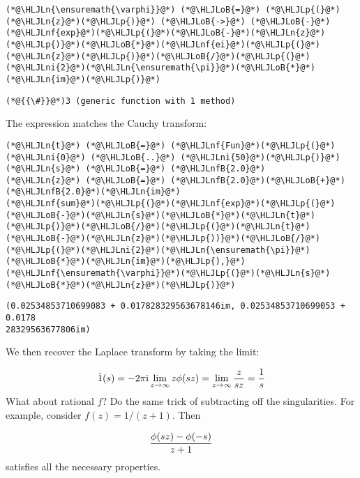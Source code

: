 \documentclass[12pt,landscape]{article}
\newcommand{\HLJLn}[1]{#1}
\newcommand{\HLJLnf}[1]{\textcolor[RGB]{66,102,213}{#1}}
\newcommand{\HLJLnfB}[1]{\textcolor[RGB]{59,151,46}{#1}}
\newcommand{\HLJLni}[1]{\textcolor[RGB]{59,151,46}{#1}}
\newcommand{\HLJLoB}[1]{\textcolor[RGB]{102,102,102}{\textbf{#1}}}
\newcommand{\HLJLp}[1]{#1}
\def\I{ {\rm i} }
\begin{document}
{\begin{lstlisting}
(*@\HLJLn{\ensuremath{\varphi}}@*) (*@\HLJLoB{=}@*) (*@\HLJLp{(}@*)(*@\HLJLn{z}@*)(*@\HLJLp{)}@*) (*@\HLJLoB{->}@*) (*@\HLJLoB{-}@*)(*@\HLJLnf{exp}@*)(*@\HLJLp{(}@*)(*@\HLJLoB{-}@*)(*@\HLJLn{z}@*)(*@\HLJLp{)}@*)(*@\HLJLoB{*}@*)(*@\HLJLnf{ei}@*)(*@\HLJLp{(}@*)(*@\HLJLn{z}@*)(*@\HLJLp{)}@*)(*@\HLJLoB{/}@*)(*@\HLJLp{(}@*)(*@\HLJLni{2}@*)(*@\HLJLn{\ensuremath{\pi}}@*)(*@\HLJLoB{*}@*)(*@\HLJLn{im}@*)(*@\HLJLp{)}@*)
\end{lstlisting}

\begin{lstlisting}
(*@{{\#}}@*)3 (generic function with 1 method)
\end{lstlisting}


The expression matches the Cauchy transform:


\begin{lstlisting}
(*@\HLJLn{t}@*) (*@\HLJLoB{=}@*) (*@\HLJLnf{Fun}@*)(*@\HLJLp{(}@*)(*@\HLJLni{0}@*) (*@\HLJLoB{..}@*) (*@\HLJLni{50}@*)(*@\HLJLp{)}@*)
(*@\HLJLn{s}@*) (*@\HLJLoB{=}@*) (*@\HLJLnfB{2.0}@*)
(*@\HLJLn{z}@*) (*@\HLJLoB{=}@*) (*@\HLJLnfB{2.0}@*)(*@\HLJLoB{+}@*)(*@\HLJLnfB{2.0}@*)(*@\HLJLn{im}@*)
(*@\HLJLnf{sum}@*)(*@\HLJLp{(}@*)(*@\HLJLnf{exp}@*)(*@\HLJLp{(}@*)(*@\HLJLoB{-}@*)(*@\HLJLn{s}@*)(*@\HLJLoB{*}@*)(*@\HLJLn{t}@*)(*@\HLJLp{)}@*)(*@\HLJLoB{/}@*)(*@\HLJLp{(}@*)(*@\HLJLn{t}@*)(*@\HLJLoB{-}@*)(*@\HLJLn{z}@*)(*@\HLJLp{))}@*)(*@\HLJLoB{/}@*)(*@\HLJLp{(}@*)(*@\HLJLni{2}@*)(*@\HLJLn{\ensuremath{\pi}}@*)(*@\HLJLoB{*}@*)(*@\HLJLn{im}@*)(*@\HLJLp{),}@*) (*@\HLJLnf{\ensuremath{\varphi}}@*)(*@\HLJLp{(}@*)(*@\HLJLn{s}@*)(*@\HLJLoB{*}@*)(*@\HLJLn{z}@*)(*@\HLJLp{)}@*)
\end{lstlisting}

\begin{lstlisting}
(0.02534853710699083 + 0.017828329563678146im, 0.02534853710699053 + 0.0178
28329563677806im)
\end{lstlisting}


We then recover the Laplace transform by taking the limit:

\[
\check 1(s) = -2 \pi \I  \lim_{z\rightarrow \infty} z \phi(s z) =
\lim_{z\rightarrow \infty} {z \over s z} = {1 \over s}
\]
What about rational $f$? Do the same trick of subtracting off the singularities. For example, consider $f(z) = 1/(z+1)$. Then

\[
{\phi(s z) - \phi(-s) \over z+1}
\]
satisfies all the necessary properties.


}
\end{document}
